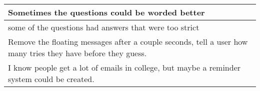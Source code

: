\begin{longtable}{|p{1\linewidth}|}
		\hline
		Sometimes the questions could be worded better                                                                                                                                                                                                                                                                                                                                                                                                                                                                                                                                                                                                                                                   \\
		\hline
		some of the questions had answers that were too strict                                                                                                                                                                                                                                                                                                                                                                                                                                                                                                                                                                                                                                           \\
		\hline
		Remove the floating messages after a couple seconds, tell a user how many tries they have before they guess.                                                                                                                                                                                                                                                                                                                                                                                                                                                                                                                                                                                     \\
		\hline
		I know people get a lot of emails in college, but maybe a reminder system could be created.                                                                                                                                                                                                                                                                                                                                                                                                                                                                                                                                                                                                      \\

\end{longtable}
